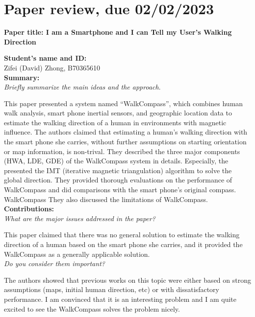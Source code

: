 \documentclass[11pt, oneside]{article}   	%
\begin{document}
\onehalfspacing

\section{Paper review, due 02/02/2023}
\begin{center}
\noindent
\textbf{\Large Paper title: I am a Smartphone and I can Tell my User's Walking Direction}
\end{center}


\noindent \textbf{Student's name and ID: }\\
Zifei (David) Zhong, B70365610\\

\noindent \textbf{Summary:}\\
\emph{Briefly summarize the main ideas and the approach}.

This paper presented a system named ``WalkCompass'', which combines human walk analysis, smart phone inertial sensors, and geographic location data to estimate the walking direction of a human in environments with magnetic influence. The authors claimed that estimating a human's walking direction with the smart phone she carries, without further assumptions on starting orientation or map information, is non-trival. They described the three major components (HWA, LDE, GDE) of the WalkCompass system in details. Especially, the presented the IMT (iterative magnetic triangulation) algorithm to solve the global direction. They provided thorough evaluations on the performance of WalkCompass and did comparisons with the smart phone's original compass.  WalkCompass  They also discussed the limitations of WalkCompass.  \\

\noindent \textbf{Contributions:}\\
\emph{What are the major issues addressed in the paper?}

This paper claimed that there was no general solution to estimate the walking direction of a human based on the smart phone she carries, and it provided the WalkCompass as a generally applicable solution. \\

\noindent \emph{Do you consider them important?}

The authors showed that previous works on this topic were either based on strong assumptions (maps, initial human direction, etc) or with dissatisfactory  performance. I am convinced that it is an interesting problem and I am quite excited to see the WalkCompass solves the problem nicely. \\
\end{document}
